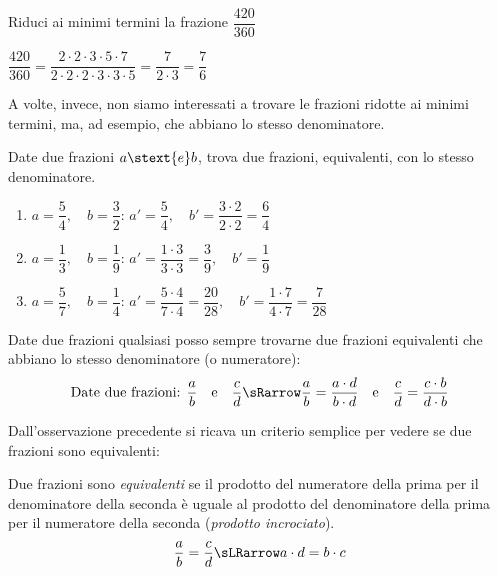 \begin{esempio}{}{}
Riduci ai minimi termini la frazione \(\dfrac{420}{360}\)

\(\dfrac{420}{360} = 
  \dfrac{2 \cdot 2 \cdot 3 \cdot 5 \cdot 7}
        {2 \cdot 2 \cdot 2 \cdot 3 \cdot 3 \cdot 5} = 
  \dfrac{7}{2 \cdot 3} = \dfrac{7}{6}\)
\end{esempio}


A volte, invece, non siamo interessati a trovare le frazioni ridotte ai 
minimi termini, ma, ad esempio,  che 
abbiano lo stesso denominatore.

\begin{esempi}{}{}
Date due frazioni \(a \stext{e} b\), trova due frazioni, equivalenti, con lo 
stesso denominatore.

\begin{enumerate} [nosep]
\spazielenx
\item \(a = \dfrac{5}{4}, \quad b = \dfrac{3}{2}\): \qquad 
\(a'=\dfrac{5}{4}, \quad b'=\dfrac{3 \cdot 2}{2 \cdot 2}=\dfrac{6}{4}\)
\item \(a = \dfrac{1}{3}, \quad b = \dfrac{1}{9}\): \qquad 
\(a'=\dfrac{1 \cdot 3}{3 \cdot 3}=\dfrac{3}{9}, \quad b'=\dfrac{1}{9}\)
\item \(a = \dfrac{5}{7}, \quad b = \dfrac{1}{4}\): \qquad 
\(a'=\dfrac{5 \cdot 4}{7 \cdot 4}=\dfrac{20}{28}, \quad 
  b'=\dfrac{1 \cdot 7}{4 \cdot 7}=\dfrac{7}{28}\)
\end{enumerate}
\end{esempi}

\begin{osservazione}{}{}
Date due frazioni qualsiasi posso sempre trovarne due frazioni equivalenti 
che abbiano lo stesso denominatore (o numeratore):
\[\text{Date due frazioni: } \frac{a}{b} \quad \text{e} \quad \frac{c}{d} 
\sRarrow
\frac{a}{b} = \frac{a \cdot d}{b \cdot d} \quad \text{e} \quad 
\frac{c}{d} = \frac{c \cdot b}{d \cdot b}\]
\end{osservazione}

Dall'osservazione precedente si ricava un criterio semplice 
per vedere se due frazioni sono equivalenti:

\begin{definizione}{}{}
 Due frazioni sono \emph{equivalenti} se il prodotto del numeratore della 
prima per il denominatore della seconda è uguale al prodotto del 
denominatore della prima per il numeratore della 
seconda 
(\emph{prodotto incrociato}).
\[\frac{a}{b} = \frac{c}{d} \sLRarrow a \cdot d = b \cdot c\]
\end{definizione}

